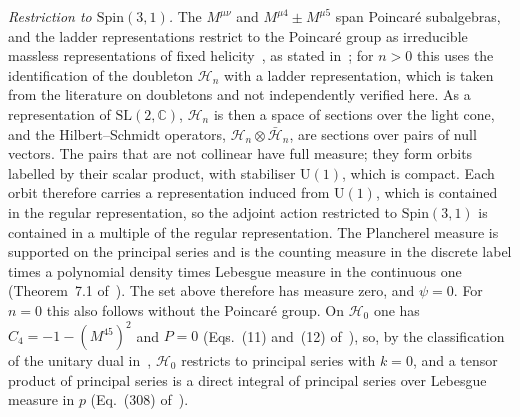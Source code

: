 \emph{Restriction to \(\mathrm{Spin}(3,1)\).} The \(M^{\mu\nu}\) and \(M^{\mu4}\pm M^{\mu5}\) span Poincar\'e subalgebras, and the ladder representations restrict to the Poincar\'e group as irreducible massless representations of fixed helicity~\cite{MackTodorov1969}, as stated in~\cite{Todorov2019}; for \(n>0\) this uses the identification of the doubleton \(\mathcal H_n\) with a ladder representation, which is taken from the literature on doubletons and not independently verified here. As a representation of \(\mathrm{SL}(2,\mathbb C)\), \(\mathcal H_n\) is then a space of sections over the light cone, and the Hilbert--Schmidt operators, \(\mathcal H_n\otimes\bar{\mathcal H}_n\), are sections over pairs of null vectors. The pairs that are not collinear have full measure; they form orbits labelled by their scalar product, with stabiliser \(\mathrm U(1)\), which is compact. Each orbit therefore carries a representation induced from \(\mathrm U(1)\), which is contained in the regular representation, so the adjoint action restricted to \(\mathrm{Spin}(3,1)\) is contained in a multiple of the regular representation. The Plancherel measure is supported on the principal series and is the counting measure in the discrete label times a polynomial density times Lebesgue measure in the continuous one (Theorem~7.1 of~\cite{FioresiYuncken2024}). The set above therefore has measure zero, and \(\psi=0\). For \(n=0\) this also follows without the Poincar\'e group. On \(\mathcal H_0\) one has \(C_4=-1-(M^{45})^2\) and \(P=0\) (Eqs.~(11) and~(12) of~\cite{MantaSteinacker2025}), so, by the classification of the unitary dual in~\cite{MartinDussaud2019}, \(\mathcal H_0\) restricts to principal series with \(k=0\), and a tensor product of principal series is a direct integral of principal series over Lebesgue measure in \(p\) (Eq.~(308) of~\cite{MartinDussaud2019}).

